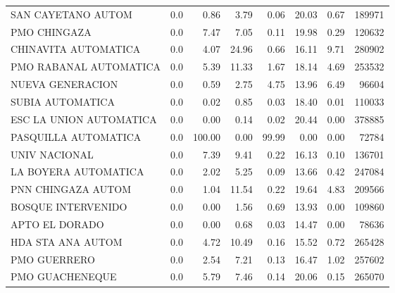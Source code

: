 \begin{enumerate}
\begin{landscape}
\begin{longtable}{p{5cm}rrrrrrr}
      SAN CAYETANO AUTOM &        0.0 &      0.86 &           3.79 &     0.06 &      20.03 &          0.67 &       189971 \\
            PMO CHINGAZA &        0.0 &      7.47 &           7.05 &     0.11 &      19.98 &          0.29 &       120632 \\
    CHINAVITA AUTOMATICA &        0.0 &      4.07 &          24.96 &     0.66 &      16.11 &          9.71 &       280902 \\
  PMO RABANAL AUTOMATICA &        0.0 &      5.39 &          11.33 &     1.67 &      18.14 &          4.69 &       253532 \\
        NUEVA GENERACION &        0.0 &      0.59 &           2.75 &     4.75 &      13.96 &          6.49 &        96604 \\
        SUBIA AUTOMATICA &        0.0 &      0.02 &           0.85 &     0.03 &      18.40 &          0.01 &       110033 \\
 ESC LA UNION AUTOMATICA &        0.0 &      0.00 &           0.14 &     0.02 &      20.44 &          0.00 &       378885 \\
    PASQUILLA AUTOMATICA &        0.0 &    100.00 &           0.00 &    99.99 &       0.00 &          0.00 &        72784 \\
           UNIV NACIONAL &        0.0 &      7.39 &           9.41 &     0.22 &      16.13 &          0.10 &       136701 \\
    LA BOYERA AUTOMATICA &        0.0 &      2.02 &           5.25 &     0.09 &      13.66 &          0.42 &       247084 \\
      PNN CHINGAZA AUTOM &        0.0 &      1.04 &          11.54 &     0.22 &      19.64 &          4.83 &       209566 \\
      BOSQUE INTERVENIDO &        0.0 &      0.00 &           1.56 &     0.69 &      13.93 &          0.00 &       109860 \\
          APTO EL DORADO &        0.0 &      0.00 &           0.68 &     0.03 &      14.47 &          0.00 &        78636 \\
       HDA STA ANA AUTOM &        0.0 &      4.72 &          10.49 &     0.16 &      15.52 &          0.72 &       265428 \\
            PMO GUERRERO &        0.0 &      2.54 &           7.21 &     0.13 &      16.47 &          1.02 &       257602 \\
         PMO GUACHENEQUE &        0.0 &      5.79 &           7.46 &     0.14 &      20.06 &          0.15 &       265070 \\

\end{longtable}
\end{landscape}
\end{enumerate}
